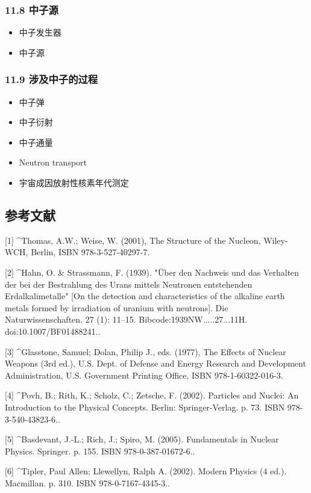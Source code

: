 \subsubsection{11.8 中子源}
\begin{itemize}
\item 中子发生器
\item 中子源
\end{itemize}

\subsubsection{11.9 涉及中子的过程}
\begin{itemize}
\item 中子弹
\item 中子衍射
\item 中子通量
\item Neutron transport
\item 宇宙成因放射性核素年代测定
\end{itemize}

\subsection{参考文献}
[1]
^Thomas, A.W.; Weise, W. (2001), The Structure of the Nucleon, Wiley-WCH, Berlin, ISBN 978-3-527-40297-7.

[2]
^Hahn, O. & Strassmann, F. (1939). "Über den Nachweis und das Verhalten der bei der Bestrahlung des Urans mittels Neutronen entstehenden Erdalkalimetalle" [On the detection and characteristics of the alkaline earth metals formed by irradiation of uranium with neutrons]. Die Naturwissenschaften. 27 (1): 11–15. Bibcode:1939NW.....27...11H. doi:10.1007/BF01488241..

[3]
^Glasstone, Samuel; Dolan, Philip J., eds. (1977), The Effects of Nuclear Weapons (3rd ed.), U.S. Dept. of Defense and Energy Research and Development Administration, U.S. Government Printing Office, ISBN 978-1-60322-016-3.

[4]
^Povh, B.; Rith, K.; Scholz, C.; Zetsche, F. (2002). Particles and Nuclei: An Introduction to the Physical Concepts. Berlin: Springer-Verlag. p. 73. ISBN 978-3-540-43823-6..

[5]
^Basdevant, J.-L.; Rich, J.; Spiro, M. (2005). Fundamentals in Nuclear Physics. Springer. p. 155. ISBN 978-0-387-01672-6..

[6]
^Tipler, Paul Allen; Llewellyn, Ralph A. (2002). Modern Physics (4 ed.). Macmillan. p. 310. ISBN 978-0-7167-4345-3..

